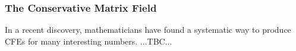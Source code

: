 \subsubsection{The Conservative Matrix Field}
In a recent discovery, mathematicians have found a systematic way to produce CFEs for many interesting numbers. ...TBC...






\begin{comment}















\end{comment}
